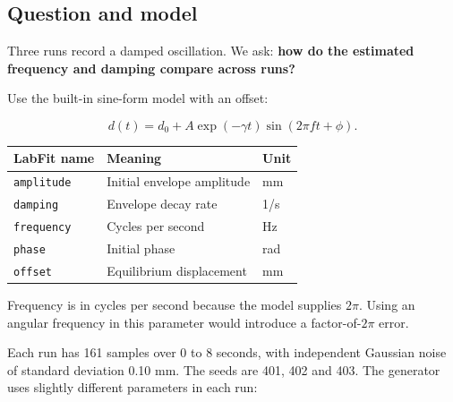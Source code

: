 \documentclass[
  british,
  10pt,
  a4paper,
]{article}
\newcommand{\passthrough}[1]{#1}
\begin{document}
\subsection{Question and model}\label{question-and-model-3}

Three runs record a damped oscillation. We ask: \textbf{how do the
estimated frequency and damping compare across runs?}

Use the built-in sine-form model with an offset:

\begin{equation}d(t)=d_0+A\exp(-\gamma t)\sin(2\pi f t+\phi).\end{equation}

\begin{longtable}[]{@{}lll@{}}
\toprule\noalign{}
LabFit name & Meaning & Unit \\
\midrule\noalign{}
\endhead
\bottomrule\noalign{}
\endlastfoot
\passthrough{\lstinline!amplitude!} & Initial envelope amplitude & mm \\
\passthrough{\lstinline!damping!} & Envelope decay rate & 1/s \\
\passthrough{\lstinline!frequency!} & Cycles per second & Hz \\
\passthrough{\lstinline!phase!} & Initial phase & rad \\
\passthrough{\lstinline!offset!} & Equilibrium displacement & mm \\
\end{longtable}

Frequency is in cycles per second because the model supplies \(2\pi\).
Using an angular frequency in this parameter would introduce a
factor-of-\(2\pi\) error.

Each run has 161 samples over 0 to 8 seconds, with independent Gaussian
noise of standard deviation 0.10 mm. The seeds are 401, 402 and 403. The
generator uses slightly different parameters in each run:
\end{document}
